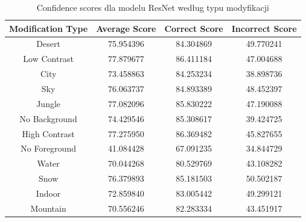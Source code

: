 \begin{table}
	\centering
	\begin{tabular}{|c|c|c|c|}
		\hline
		\textbf{Modification Type} & \textbf{Average Score} & \textbf{Correct Score} & \textbf{Incorrect Score} \\
		\hline
		Desert & 75.954396 & 84.304869 & 49.770241 \\
		\hline
		Low Contrast & 77.879677 & 86.411184 & 47.004688 \\
		\hline
		City & 73.458863 & 84.253234 & 38.898736 \\
		\hline
		Sky & 76.063737 & 84.893389 & 48.452397 \\
		\hline
		Jungle & 77.082096 & 85.830222 & 47.190088 \\
		\hline
		No Background & 74.429546 & 85.308617 & 39.424725 \\
		\hline
		High Contrast & 77.275950 & 86.369482 & 45.827655 \\
		\hline
		No Foreground & 41.084428 & 67.091235 & 34.844729 \\
		\hline
		Water & 70.044268 & 80.529769 & 43.108282 \\
		\hline
		Snow & 76.379893 & 85.181503 & 50.502187 \\
		\hline
		Indoor & 72.859840 & 83.005442 & 49.299121 \\
		\hline
		Mountain & 70.556246 & 82.283334 & 43.451917 \\
		\hline
	\end{tabular}
	\caption{Confidence scores dla modelu ResNet według typu modyfikacji}
	\label{tab:resnet_confidence_scores_modification}
\end{table}

